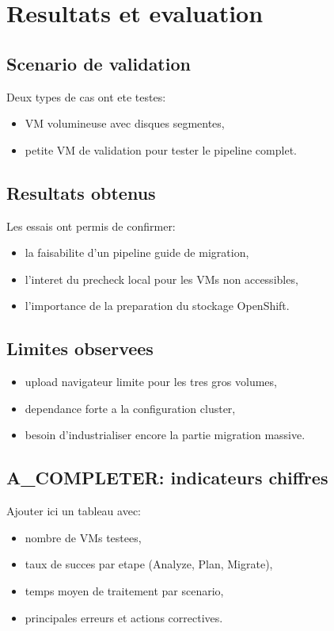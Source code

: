 ﻿\chapter{Resultats et evaluation}

\section{Scenario de validation}
Deux types de cas ont ete testes:
\begin{itemize}[leftmargin=1.2cm]
  \item VM volumineuse avec disques segmentes,
  \item petite VM de validation pour tester le pipeline complet.
\end{itemize}

\section{Resultats obtenus}
Les essais ont permis de confirmer:
\begin{itemize}[leftmargin=1.2cm]
  \item la faisabilite d'un pipeline guide de migration,
  \item l'interet du precheck local pour les VMs non accessibles,
  \item l'importance de la preparation du stockage OpenShift.
\end{itemize}

\section{Limites observees}
\begin{itemize}[leftmargin=1.2cm]
  \item upload navigateur limite pour les tres gros volumes,
  \item dependance forte a la configuration cluster,
  \item besoin d'industrialiser encore la partie migration massive.
\end{itemize}

\section{A_COMPLETER: indicateurs chiffres}
Ajouter ici un tableau avec:
\begin{itemize}[leftmargin=1.2cm]
  \item nombre de VMs testees,
  \item taux de succes par etape (Analyze, Plan, Migrate),
  \item temps moyen de traitement par scenario,
  \item principales erreurs et actions correctives.
\end{itemize}
